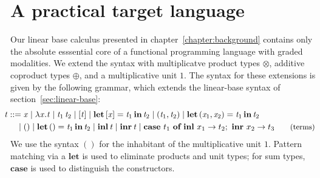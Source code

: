 \section{A practical target language}
Our linear base calculus presented in chapter~\ref{chapter:background} contains
only the absolute esssential core of a functional programming
language with graded modalities. We extend the syntax with multiplicatve
product types $\otimes$, additive coproduct types $\oplus$, and a multiplicative unit
$1$. The syntax for these extensions is given by the following grammar, which
extends the linear-base syntax of section~\ref{sec:linear-base}:
\begin{align*}
\hspace{-0.8em} \GRANULEnt{t} ::= \;
       & \GRANULEmv{x}
  \mid \lambda  \GRANULEmv{x}  .  \GRANULEnt{t}
  \mid \GRANULEnt{t_{{\mathrm{1}}}} \, \GRANULEnt{t_{{\mathrm{2}}}}
  \mid \GRANULEsym{[}  \GRANULEnt{t}  \GRANULEsym{]}
  \mid \textbf{let} \, [  \GRANULEmv{x}  ] =  \GRANULEnt{t_{{\mathrm{1}}}}  \, \textbf{in} \,  \GRANULEnt{t_{{\mathrm{2}}}}
\mid ( \GRANULEnt{t_{{\mathrm{1}}}} ,  \GRANULEnt{t_{{\mathrm{2}}}} )
  \mid \textbf{let} \, ( \GRANULEmv{x_{{\mathrm{1}}}} ,  \GRANULEmv{x_{{\mathrm{2}}}} ) =  \GRANULEnt{t_{{\mathrm{1}}}}  \, \textbf{in} \,  \GRANULEnt{t_{{\mathrm{2}}}} \\
\hspace{-0.9em}  \mid \; & () \mid \GRANULEkw{let} \, \GRANULEsym{()}  \GRANULEsym{=}  \GRANULEnt{t_{{\mathrm{1}}}} \, \GRANULEkw{in} \, \GRANULEnt{t_{{\mathrm{2}}}}
\mid \GRANULEkw{inl} \, \GRANULEnt{t} \mid \GRANULEkw{inr} \, \GRANULEnt{t} \mid \textbf{case} \ t_{1}\ \textbf{of}\ \textbf{inl}\ x_{1} \rightarrow t_{2};\ \textbf{inr}\ x_{2} \rightarrow t_{3}
{\small{\tag{terms}}}
\end{align*}
We use the syntax $()$ for the inhabitant of  the
multiplicative unit $1$. Pattern matching via a $\textbf{let}$
is used to eliminate products and unit types; for sum types,
$\textbf{case}$ is used to distinguish the constructors.

